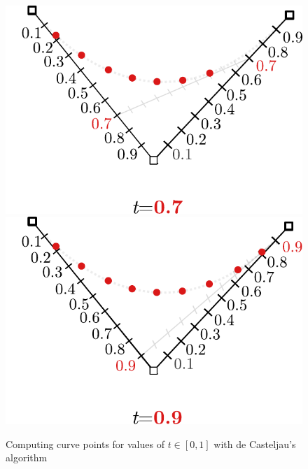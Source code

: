 \documentclass[12pt,openany,a4,usenames,dvipsnames]{book}
\begin{document}
\begin{figure}[H]
\begin{minipage}{0.49\textwidth}
  \end{minipage}
  \par
  \begin{minipage}{0.49\textwidth}
    \includegraphics[width=\textwidth,keepaspectratio]{figures/bezier_step_0.7.pdf}
  \end{minipage}
  \hspace{.1em}
  \begin{minipage}{0.49\textwidth}
    \includegraphics[width=\textwidth,keepaspectratio]{figures/bezier_step_0.9.pdf}
  \end{minipage}\par
  \vspace{1em}
  {\noindent{}Computing curve points for values of $t \in [0, 1]$ with de Casteljau's algorithm}
\end{figure}
\end{document}
